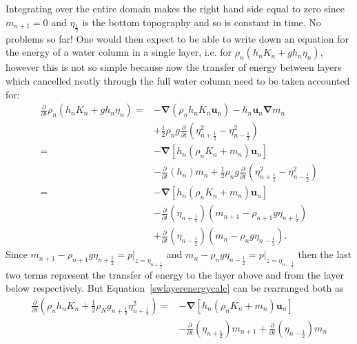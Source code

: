 \documentclass[12pt,a4paper]{report}
\newcommand*\equref[1]{Equation~\eqref{#1}}
\newcommand*{\half}{\frac{1}{2}}
\begin{document}
    Integrating over the entire domain makes the right hand side equal to zero since
    $m_{n+1} = 0$ and $\eta_{\half }$ is the bottom topography and so is constant in
    time. No problems so far! One would then expect to be able to write down
    an equation for the energy of a water column in a single layer, i.e. for 
    $\rho_{n}\left(h_{n} K_{n}+ g h_{n}\eta_{n}\right)$, however this is not
    so simple because now the transfer of energy between layers which cancelled neatly
    through the full water column need to be taken accounted for:
    \begin{equation}
    \label{swlayerenergycalc}
    \begin{split}
    \frac{\partial}{\partial t}\rho_{n}\left(h_{n} K_{n}+ g h_{n}\eta_{n}\right) 
    =& - \boldsymbol{\nabla} \left(\rho_{n} h_{n} K_{n} \boldsymbol{u}_{n}\right) 
    - h_{n} \boldsymbol{u}_{n}  \boldsymbol{\nabla} m_{n} \\
    &+\half  \rho_{n} g \frac{\partial}{\partial t}\left(\eta_{n+\half }^{2} -\eta_{n-\half }^{2}\right) \\
    =& - \boldsymbol{\nabla} \left[h_{n}  \left(\rho_{n}K_{n}+ m_{n}\right) \boldsymbol{u}_{n}\right] \\
    &- \frac{\partial}{\partial t}\left(h_{n}\right)   m_{n}
    +\half  \rho_{n} g \frac{\partial}{\partial t}\left(\eta_{n+\half }^{2} -\eta_{n-\half }^{2}\right) \\
    =& -\boldsymbol{\nabla} \left[h_{n} \left(\rho_{n}K_{n}+m_{n}\right) \boldsymbol{u}_{n}\right] \\
    &- \frac{\partial}{\partial t}\left(\eta_{n+\half }\right)\left(   m_{n+1} - \rho_{n+1}g \eta_{n+\half }\right) \\
    &+ \frac{\partial}{\partial t}\left(\eta_{n-\half }\right)\left(   m_{n}- \rho_{n}g \eta_{n-\half }\right).
    \end{split}
    \end{equation}
    Since $m_{n+1} - \rho_{n+1}g \eta_{n+\half }=p\rvert_{z=\eta_{n+\half }}$ and
    $m_{n} - \rho_{n}g \eta_{n-\half }=p\rvert_{z=\eta_{n-\half }}$ then the last
    two terms represent the transfer of energy to the layer above and from the layer below
    respectively. But \equref{swlayerenergycalc}
    can be rearranged both as
    \begin{equation}
    \begin{split}
    \frac{\partial}{\partial t}\left(\rho_{n} h_{n} K_{n}+ 
    \half \rho_{N} g_{n+\half }\eta_{n+\half }^{2} \right) 
    =& -\boldsymbol{\nabla} \left[h_{n} \left(\rho_{n}K_{n}+m_{n}\right) \boldsymbol{u}_{n}\right]\\ 
    &- \frac{\partial}{\partial t}\left(\eta_{n+\half }\right)   m_{n+1}
    + \frac{\partial}{\partial t}\left(\eta_{n-\half }\right) m_{n}
    \end{split}
    \label{swlayercorrectenergy}
    \end{equation}
\end{document}
